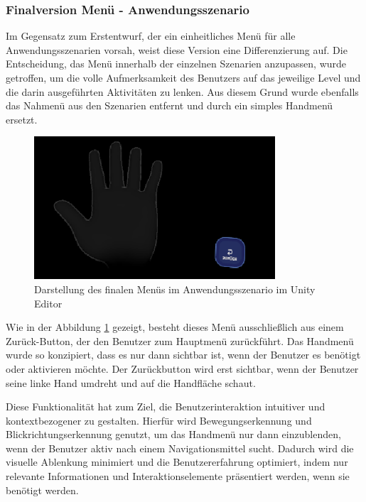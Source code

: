 \subsubsection{Finalversion Menü - Anwendungsszenario}
Im Gegensatz zum Erstentwurf, der ein einheitliches Menü für alle Anwendungsszenarien vorsah, weist diese Version eine Differenzierung auf. Die Entscheidung, das Menü innerhalb der einzelnen Szenarien anzupassen, wurde getroffen, um die volle Aufmerksamkeit des Benutzers auf das jeweilige Level und die darin ausgeführten Aktivitäten zu lenken. Aus diesem Grund wurde ebenfalls das Nahmenü aus den Szenarien entfernt und durch ein simples Handmenü ersetzt.

\begin{figure}[H]
    \centering
    \includegraphics[width=0.8\textwidth]{images/backbutton.png}
    \caption{Darstellung des finalen Menüs im Anwendungsszenario im Unity Editor}
    \label{fig:backbutton}
\end{figure}

Wie in der Abbildung \ref{fig:backbutton} gezeigt, besteht dieses Menü ausschließlich aus einem Zurück-Button, der den Benutzer zum Hauptmenü zurückführt. Das Handmenü wurde so konzipiert, dass es nur dann sichtbar ist, wenn der Benutzer es benötigt oder aktivieren möchte.  Der Zurückbutton wird erst sichtbar, wenn der Benutzer seine linke Hand umdreht und auf die Handfläche schaut.

Diese Funktionalität hat zum Ziel, die Benutzerinteraktion intuitiver und kontextbezogener zu gestalten. Hierfür wird Bewegungserkennung und Blickrichtungserkennung genutzt, um das Handmenü nur dann einzublenden, wenn der Benutzer aktiv nach einem Navigationsmittel sucht. Dadurch wird die visuelle Ablenkung minimiert und die Benutzererfahrung optimiert, indem nur relevante Informationen und Interaktionselemente präsentiert werden, wenn sie benötigt werden.


